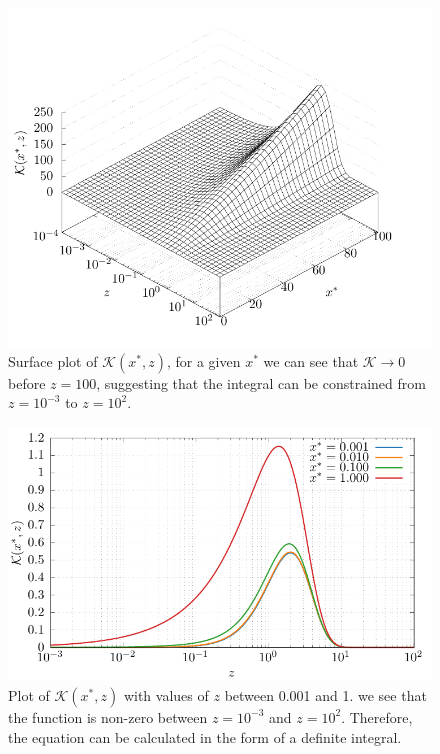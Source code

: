 \begin{figure}[ht]
  \centering
  \includegraphics{assets/integral/func_xe_3d.pdf}
  \caption[3D plot of $\mathcal{K}(x^*,z)$]{Surface plot of $\mathcal{K}(x^*,z)$, for a given $x^*$ we can see that $\mathcal{K} \rightarrow 0$ before $z = 100$, suggesting that the integral can be constrained from $z=10^{-3}$ to $z=10^2$.}
  \label{fig:constrainplot3d}
\end{figure}

\begin{figure}[ht]
  \centering
  \includegraphics{assets/integral/func_xe_plot.pdf}
  \caption[Plot of $\mathcal{K}(x^*,z)$ for discrete values of $z$]{Plot of $\mathcal{K}(x^*,z)$ with values of $z$ between 0.001 and 1. we see that the function is non-zero between $z=10^{-3}$ and $z=10^2$. Therefore, the equation can be calculated in the form of a definite integral.}
  \label{fig:constrainplot2d}
\end{figure}

